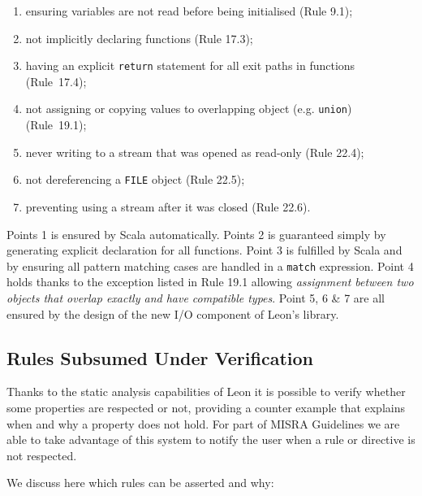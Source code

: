 \documentclass[a4paper,twoside]{article}
\newcommand{\InlineC}[1]{\lstinline[language=C99]|#1|}
\newcommand{\InlineS}[1]{\lstinline[language=Leon]|#1|}
\begin{document}
\begin{enumerate}

\item ensuring variables are not read before being initialised (Rule 9.1);

\item not implicitly declaring functions (Rule 17.3);

\item having an explicit \InlineC{return} statement for all exit paths in
functions (Rule~17.4);

\item not assigning or copying values to overlapping object (e.g.
\InlineC{union}) (Rule~19.1);

\item never writing to a stream that was opened as read-only (Rule 22.4);

\item not dereferencing a \InlineC{FILE} object (Rule 22.5);

\item preventing using a stream after it was closed (Rule 22.6).

\end{enumerate}

Points 1 is ensured by Scala automatically. Points 2 is guaranteed simply by
generating explicit declaration for all functions. Point 3 is fulfilled by Scala
and by ensuring all pattern matching cases are handled in a \InlineS{match}
expression. Point 4 holds thanks to the exception listed in Rule 19.1 allowing
\textit{assignment between two objects that overlap exactly and have compatible
types}. Point 5, 6 \& 7 are all ensured by the design of the new I/O component
of Leon's library.

\subsection{Rules Subsumed Under Verification}
\label{verified_rules}

Thanks to the static analysis capabilities of Leon it is possible to verify
whether some properties are respected or not, providing a counter example that
explains when and why a property does not hold. For part of MISRA Guidelines we
are able to take advantage of this system to notify the user when a rule or
directive is not respected.

\pagebreak
We discuss here which rules can be asserted and why:
\end{document}
